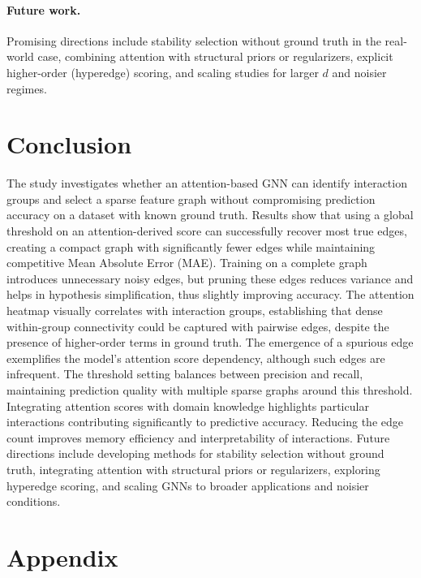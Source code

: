 \documentclass[10pt,a4paper]{article}
\begin{document}
\paragraph{Future work.}
Promising directions include stability selection without ground truth in the real-world case, combining attention with structural priors or regularizers, explicit higher-order (hyperedge) scoring, and scaling studies for larger $d$ and noisier regimes.

\section{Conclusion}
The study investigates whether an attention-based GNN can identify interaction groups and select a sparse feature graph without compromising prediction accuracy on a dataset with known ground truth. Results show that using a global threshold on an attention-derived score can successfully recover most true edges, creating a compact graph with significantly fewer edges while maintaining competitive Mean Absolute Error (MAE). Training on a complete graph introduces unnecessary noisy edges, but pruning these edges reduces variance and helps in hypothesis simplification, thus slightly improving accuracy. The attention heatmap visually correlates with interaction groups, establishing that dense within-group connectivity could be captured with pairwise edges, despite the presence of higher-order terms in ground truth. The emergence of a spurious edge exemplifies the model's attention score dependency, although such edges are infrequent. The threshold setting balances between precision and recall, maintaining prediction quality with multiple sparse graphs around this threshold. Integrating attention scores with domain knowledge highlights particular interactions contributing significantly to predictive accuracy. Reducing the edge count improves memory efficiency and interpretability of interactions. Future directions include developing methods for stability selection without ground truth, integrating attention with structural priors or regularizers, exploring hyperedge scoring, and scaling GNNs to broader applications and noisier conditions.






\newpage
\appendix
\section{Appendix}
\end{document}
